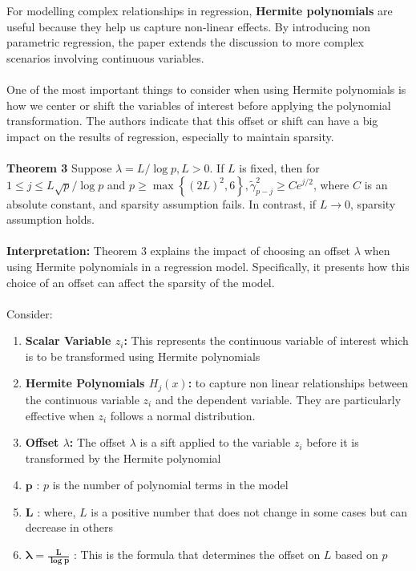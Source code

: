 For modelling complex relationships in regression, \textbf{Hermite polynomials} are useful because they help us capture non-linear effects. By introducing non parametric regression, the paper extends the discussion to more complex scenarios involving continuous variables. \\
\\
One of the most important things to consider when using Hermite polynomials is how we center or shift the variables of interest before applying the polynomial transformation. The authors indicate that this offset or shift can have a big impact on the results of regression, especially to maintain sparsity.\\
\\
\textbf{Theorem 3} Suppose $\lambda=L / \log p, L>0$. If $L$ is fixed, then for $1 \leq j \leq L \sqrt{p} / \log p$ and $p \geq \max \left\{(2 L)^2, 6\right\}, \tilde{\gamma}_{p-j}^2 \geq C e^{j / 2}$, where $C$ is an absolute constant, and sparsity assumption fails. In contrast, if $L \rightarrow 0$, sparsity assumption holds.\\
\\
\textbf{Interpretation:} Theorem 3 explains the impact of choosing an offset $\lambda$ when using Hermite polynomials in a regression model. Specifically, it presents how this choice of an offset can affect the sparsity of the model. \\
\\
Consider:
\begin{enumerate}
    \item \textbf{Scalar Variable $z_i$:} This represents the continuous variable of interest which is to be transformed using Hermite polynomials
    \item \textbf{Hermite Polynomials $H_j (x)$:} to capture non linear relationships between the continuous variable $z_i$ and the dependent variable. They are particularly effective when $z_i$ follows a normal distribution. 
    \item \textbf{Offset $\lambda$:} The offset $\lambda$ is a sift applied to the variable $z_i$ before it is transformed by the Hermite polynomial
    \item $\boldsymbol{p}$ :  $p$ is the number of polynomial terms in the model
    \item $\boldsymbol{L}$ : where, $L$ is a positive number that does not change in some cases but can decrease in others
    \item $\boldsymbol{\lambda = \frac{L}{\log p}}$ : This is the formula that determines the offset on $L$ based on $p$
\end{enumerate}

